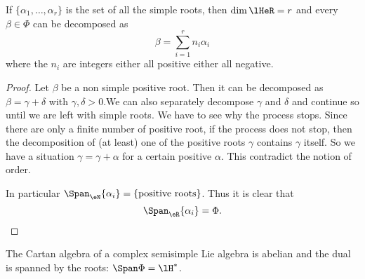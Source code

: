 \begin{theorem}
    If $\{\alpha_1,\ldots,\alpha_r\}$ is the set of all the simple roots, then $\dim\lHeR=r$ and every $\beta\in\Phi$ can be decomposed as
    \[
        \beta=\sum_{i=1}^rn_i\alpha_i
    \]
    where the $n_i$ are integers either all positive either all negative.
\end{theorem}

\begin{proof}
    Let $\beta$ be a non simple positive root. Then it can be decomposed as $\beta=\gamma+\delta$ with $\gamma,\delta>0$.We can also separately decompose $\gamma$ and $\delta$ and continue so until we are left with simple roots. We have to see why the process stops. Since there are only a finite number of positive root, if the process does not stop, then the decomposition of (at least) one of the positive roots $\gamma$ contains $\gamma$ itself. So we have a situation $\gamma=\gamma+\alpha$ for a certain positive $\alpha$. This contradict the notion of order.

    In particular $\Span_{\eN}\{\alpha_i\}=\{\textrm{positive roots}\}$. Thus it is clear that
    \[
        \Span_{\eR}\{\alpha_i\}=\Phi.
    \]
\end{proof}


\begin{theorem}\label{tho:Phi_base}
The Cartan algebra of a complex semisimple Lie algebra is abelian and the dual is spanned by the roots: \( \Span\Phi=\lH^*\).
\end{theorem}

